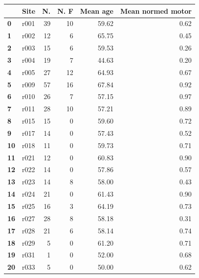 \documentclass[10pt]{article}
\begin{document}
\begin{tabular}{|l|l|r|r|r|r|}
\hline {} &  Site &   N. &  N. F &  Mean age &  Mean normed motor \\ \hline
\textbf{0 } &  r001 &  39 &         10 &     59.62 &               0.62 \\ 
\textbf{1 } &  r002 &  12 &          6 &     65.75 &               0.45 \\
\textbf{2 } &  r003 &  15 &          6 &     59.53 &               0.26 \\ 
\textbf{3 } &  r004 &  19 &          7 &     44.63 &               0.20 \\ 
\textbf{4 } &  r005 &  27 &         12 &     64.93 &               0.67 \\
\textbf{5 } &  r009 &  57 &         16 &     67.84 &               0.92 \\ 
\textbf{6 } &  r010 &  26 &          7 &     57.15 &               0.97 \\ 
\textbf{7 } &  r011 &  28 &         10 &     57.21 &               0.89 \\ 
\textbf{8 } &  r015 &  15 &          0 &     59.60 &               0.72 \\ 
\textbf{9 } &  r017 &  14 &          0 &     57.43 &               0.52 \\
\textbf{10} &  r018 &  11 &          0 &     59.73 &               0.71 \\ 
\textbf{11} &  r021 &  12 &          0 &     60.83 &               0.90 \\
\textbf{12} &  r022 &  14 &          0 &     57.86 &               0.57 \\ 
\textbf{13} &  r023 &  14 &          8 &     58.00 &               0.43 \\ 
\textbf{14} &  r024 &  21 &          0 &     61.43 &               0.90 \\ 
\textbf{15} &  r025 &  16 &          3 &     64.19 &               0.73 \\ 
\textbf{16} &  r027 &  28 &          8 &     58.18 &               0.31 \\
\textbf{17} &  r028 &  21 &          6 &     58.14 &               0.74 \\
\textbf{18} &  r029 &   5 &          0 &     61.20 &               0.71 \\ 
\textbf{19} &  r031 &   1 &          0 &     52.00 &               0.68 \\ 
\textbf{20} &  r033 &   5 &          0 &     50.00 &               0.62 \\ 

\end{tabular}
\end{document}
